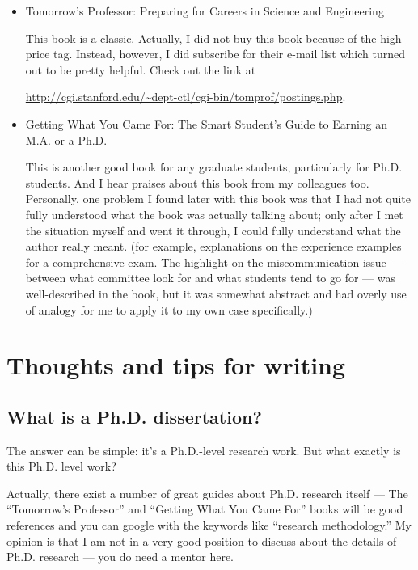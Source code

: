 \documentclass[11pt]{article}
\begin{document}
\begin{itemize}
    \item Tomorrow's Professor: Preparing for Careers in Science and
        Engineering

        This book is a classic. Actually, I did not buy this book because of
        the high price tag. Instead, however, I did subscribe for
        their e-mail list which turned out to be pretty helpful.  Check out the
        link at
        \begin{small}\url{http://cgi.stanford.edu/\~dept-ctl/cgi-bin/tomprof/postings.php}.\end{small}

    \item Getting What You Came For: The Smart Student's Guide to Earning an
        M.A. or a Ph.D.

        This is another good book for any graduate students, particularly for
        Ph.D. students. And I hear praises about this book from my colleagues
        too. Personally, one problem I found later with this book was that I
        had not quite fully understood what the book was actually talking
        about; only after I met the situation myself and went it through, I
        could fully understand what the author really meant. (for example,
        explanations on the experience examples for a comprehensive exam. The
        highlight on the miscommunication issue --- between what committee
        look for and what students tend to go for --- was well-described in
        the book, but it was somewhat abstract and had overly use of analogy
        for me to apply it to my own case specifically.)


\end{itemize}


\section{Thoughts and tips for writing}

\subsection{What is a Ph.D. dissertation?}
The answer can be simple: it's a Ph.D.-level research work. But what exactly is
this Ph.D. level work? 

Actually, there exist a number of great guides about Ph.D. research itself --- 
The ``Tomorrow's Professor'' and ``Getting What You Came For'' books will be
good references and you can google with the keywords like ``research
methodology.'' My opinion is that I am not in a very good position to discuss
about the details of Ph.D. research --- you do need a mentor here.
\end{document}
